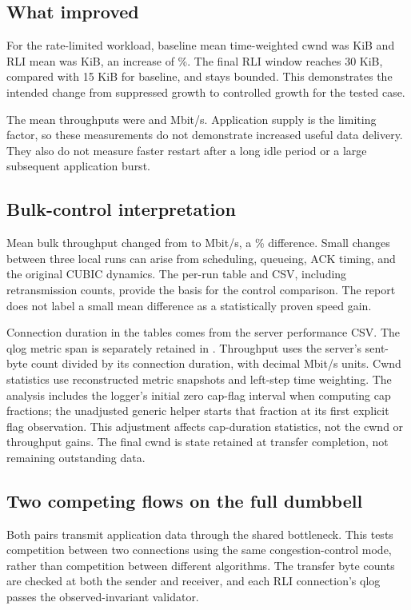 \documentclass[11pt,a4paper]{article}
\begin{document}
\subsection{What improved}
For the rate-limited workload, baseline mean time-weighted cwnd was
\RateBaselineCwnd{} KiB and RLI mean was \RateRliCwnd{} KiB, an increase
of \WindowChange\%. The final RLI window reaches 30 KiB, compared with
15 KiB for baseline, and stays bounded. This demonstrates the intended
change from suppressed growth to controlled growth for the tested case.

The mean throughputs were \RateBaselineThroughput{} and
\RateRliThroughput{} Mbit/s. Application supply is the limiting factor,
so these measurements do not demonstrate increased useful data delivery.
They also do not measure faster restart after a long idle period or a
large subsequent application burst.

\subsection{Bulk-control interpretation}
Mean bulk throughput changed from \BulkBaselineThroughput{} to
\BulkRliThroughput{} Mbit/s, a \BulkChange\% difference. Small changes
between three local runs can arise from scheduling, queueing, ACK timing,
and the original CUBIC dynamics. The per-run table and CSV, including
retransmission counts, provide the basis for the control comparison.
The report does not label a small mean difference as a statistically
proven speed gain.

Connection duration in the tables comes from the server performance CSV.
The qlog metric span is separately retained in .
Throughput uses the server's sent-byte count divided by its connection
duration, with decimal Mbit/s units. Cwnd statistics use reconstructed
metric snapshots and left-step time weighting. The analysis includes the
logger's initial zero cap-flag interval when computing cap fractions;
the unadjusted generic helper starts that fraction at its first explicit
flag observation. This adjustment affects cap-duration statistics, not
the cwnd or throughput gains. The final cwnd is state
retained at transfer completion, not remaining outstanding data.

\subsection{Two competing flows on the full dumbbell}

Both pairs transmit application data through the shared bottleneck. This
tests competition between two connections using the same congestion-control
mode, rather than competition between different algorithms. The transfer
byte counts are checked at both the sender and receiver, and each RLI
connection's qlog passes the observed-invariant validator.
\end{document}
